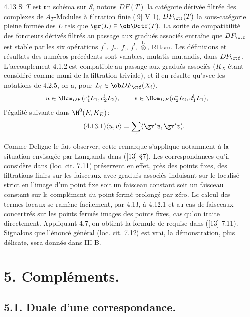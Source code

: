 \begin{statement}{4.13}
Si $T$ est un schéma sur $S$, notons $DF(T)$ la catégorie dérivée filtrée des complexes de $A_T$-Modules à filtration finie ([9] V 1), $DF_{\ctf}(T)$ la sous-catégorie pleine formée des $L$ tels que $\gr(L)\in\ob\Dctf(T)$. La sorite de compatibilité des foncteurs dérivés filtrés au passage aux gradués associés entraîne que $DF_{\ctf}$ est stable par les six opérations $f^*$, $f_*$, $f_!$, $f^!$, $\overset{\mathrm{L}}{\otimes}$, $\mathrm{R}\underline{\mathrm{Hom}}$. Les définitions et résultats des numéros précédents sont valables, mutatis mutandis, dans $DF_{\ctf}$. L'accouplement 4.1.2 est compatible au passage aux gradués associés ($K_X$ étant considéré comme muni de la filtration triviale), et il en résulte qu'avec les notations de 4.2.5, on a, pour $L_i\in\ob DF_{\ctf}(X_i)$,
\[
u\in\Hom_{DF}(c_1^*L_1,c_2^!L_2),\qquad
v\in\Hom_{DF}(d_2^*L_2,d_1^!L_1),
\]
l'égalité suivante dans $\H^0(E,K_E)$:
\begin{equation}
\tag{4.13.1}
\langle u,v\rangle=\sum_i\langle \gr^i u,\gr^i v\rangle.
\end{equation}
Comme Deligne le fait observer, cette remarque s'applique notamment à la situation envisagée par Langlands dans ([13] §7). Les correspondances qu'il considère dans (loc. cit. 7.11) préservent en effet, près des points fixes, des filtrations finies sur les faisceaux avec gradués associés induisant sur le localisé strict en l'image d'un point fixe soit un faisceau constant soit un faisceau constant sur le complément du point fermé prolongé par zéro. Le calcul des termes locaux se ramène facilement, par 4.13, à 4.12.1 et au cas de faisceaux concentrés sur les points fermés images des points fixes, cas qu'on traite directement. Appliquant 4.7, on obtient la formule de  requise dans ([13] 7.11). Signalons que l'énoncé général (loc. cit. 7.12) est vrai, la démonstration, plus délicate, sera donnée dans III B.
\end{statement}



\section*{5. Compléments.}

\subsection*{5.1. Duale d'une correspondance.}

